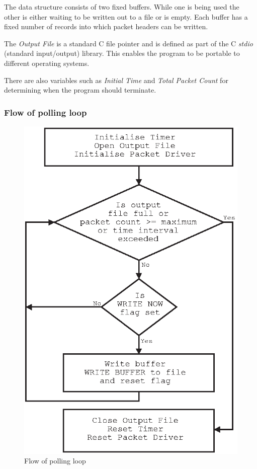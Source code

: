 The data structure consists of two fixed buffers.  While one is being
used the other is either waiting to be written out to a file or is
empty.  Each buffer has a fixed number of records into which packet
headers can be written.

The {\em Output File} is a standard C file pointer and is defined as
part of the C {\em stdio} (standard input/output) library.  This
enables the program to be portable to different operating systems.

There are also variables such as {\em Initial Time} and {\em Total
Packet Count} for determining when the program should terminate.

\subsubsection{Flow of polling loop}

\begin{figure}
\begin{center}
\leavevmode
\includegraphics{pics/trace-flow.eps}
\end{center}
\caption{Flow of polling loop}
\label{trace:flow}
\end{figure}

